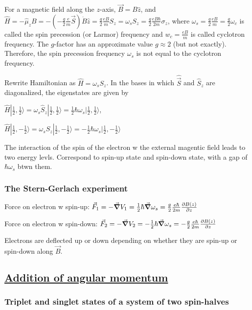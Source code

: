 For a magnetic field along the $z$-axis, $\vec{B} = B \widehat{z}$, and $\widehat{H} = -\widehat{\mu}_z B = -(-\frac{g}{2} \frac{e}{m} \vec{S}) \dot B \widehat{z} = \frac{g}{2} \frac{eB}{m} S_z = \omega_s S_z = \frac{g}{2} \frac{eB\hbar}{2m} \sigma_z$, where $\omega_s = \frac{g}{2} \frac{eB}{m} = \frac{g}{2} \omega_c$ is called the spin precession (or Larmor) frequency and $w_c = \frac{e B}{m}$ is called cyclotron frequency. The $g$-factor has an approximate value $g \approx 2$ (but not exactly). Therefore, the spin precession frequency $\omega_s$ is not equal to the cyclotron frequency. 

Rewrite Hamiltonian as $\widehat{H} = \omega_s S_z$. In the bases in which $\widehat{\vec{S}}$ and $\widehat{S}_z$ are diagonalized, the eigenstates are given by 

$\widehat{H} | \frac{1}{2}, \frac{1}{2} \rangle = \omega_s \widehat{S}_z | \frac{1}{2}, \frac{1}{2} \rangle = \frac{1}{2} \hbar \omega_s | \frac{1}{2}, \frac{1}{2} \rangle$, 

$\widehat{H} | \frac{1}{2}, -\frac{1}{2} \rangle = \omega_s \widehat{S}_z | \frac{1}{2}, -\frac{1}{2} \rangle = - \frac{1}{2} \hbar \omega_s | \frac{1}{2}, -\frac{1}{2} \rangle$

The interaction of the spin of the electron w the external magentic field leads to two energy levls. Correspond to spin-up state and spin-down state, with a gap of $\hbar \omega_s$ btwn them.

\subsubsection{The Stern-Gerlach experiment} \hfill

Force on electron w spin-up: $\vec{F}_1 = -\vec{\grad} V_1 = \frac{1}{2} \hbar \vec{\grad} \omega_s = \frac{g}{2} \frac{e \hbar}{2m} \pdv{B(z)}{z}$

Force on electron w spin-down: $\vec{F}_2 = -\vec{\grad} V_2 = -\frac{1}{2} \hbar \vec{\grad} \omega_s = - \frac{g}{2} \frac{e \hbar}{2m} \pdv{B(z)}{z}$

Electrons are deflected up or down depending on whether they are spin-up or spin-down along $\vec{B}$.

\subsection{\underline{Addition of angular momentum}}

\subsubsection{Triplet and singlet states of a system of two spin-halves}

